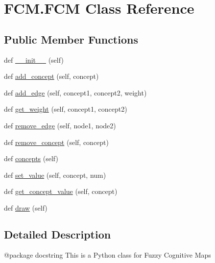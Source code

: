 \hypertarget{class_f_c_m_1_1_f_c_m}{}\section{F\+C\+M.\+F\+CM Class Reference}
\label{class_f_c_m_1_1_f_c_m}
\subsection*{Public Member Functions}
\begin{DoxyCompactItemize}
\item 
def \hyperlink{class_f_c_m_1_1_f_c_m_aba98e39a31a4bd9cb8eb8887dd98bbc0}{\+\_\+\+\_\+init\+\_\+\+\_\+} (self)
\item 
def \hyperlink{class_f_c_m_1_1_f_c_m_a57dff35d123327af6d02f335a49c4177}{add\+\_\+concept} (self, concept)
\item 
def \hyperlink{class_f_c_m_1_1_f_c_m_a4e32ab9228e8f678e6892092d643062d}{add\+\_\+edge} (self, concept1, concept2, weight)
\item 
def \hyperlink{class_f_c_m_1_1_f_c_m_a619a5925ca824a4e633378e2ceeca1fd}{get\+\_\+weight} (self, concept1, concept2)
\item 
def \hyperlink{class_f_c_m_1_1_f_c_m_a672188f630f4a42d330f7dc967933054}{remove\+\_\+edge} (self, node1, node2)
\item 
def \hyperlink{class_f_c_m_1_1_f_c_m_afcc0b9388e36ebe07b5b3b6c6d877a05}{remove\+\_\+concept} (self, concept)
\item 
def \hyperlink{class_f_c_m_1_1_f_c_m_abd95880fc46feca8042343b1556b61f1}{concepts} (self)
\item 
def \hyperlink{class_f_c_m_1_1_f_c_m_a55a0daf5c9eecef4639bb15ded281aa5}{set\+\_\+value} (self, concept, num)
\item 
def \hyperlink{class_f_c_m_1_1_f_c_m_ae764998f2c68740a4e80de8104da992d}{get\+\_\+concept\+\_\+value} (self, concept)
\item 
def \hyperlink{class_f_c_m_1_1_f_c_m_a97f12131aafc3d810da3ff95fb69ae1d}{draw} (self)
\end{DoxyCompactItemize}


\subsection{Detailed Description}
\begin{DoxyVerb}@package docstring
This is a Python class  for Fuzzy Cognitive Maps\end{DoxyVerb}
 

